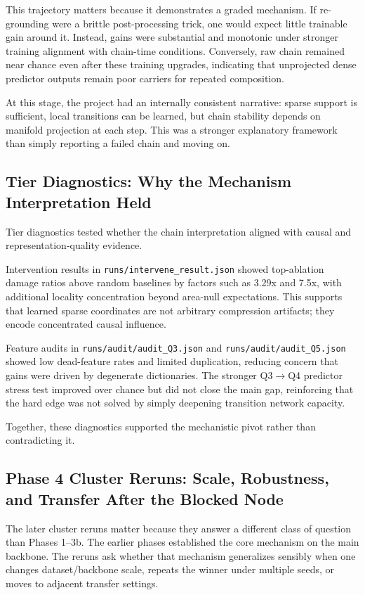 \documentclass[11pt]{article}
\begin{document}
This trajectory matters because it demonstrates a graded mechanism. If re-grounding were a brittle post-processing trick, one would expect little trainable gain around it. Instead, gains were substantial and monotonic under stronger training alignment with chain-time conditions. Conversely, raw chain remained near chance even after these training upgrades, indicating that unprojected dense predictor outputs remain poor carriers for repeated composition.

At this stage, the project had an internally consistent narrative: sparse support is sufficient, local transitions can be learned, but chain stability depends on manifold projection at each step. This was a stronger explanatory framework than simply reporting a failed chain and moving on.

\subsection{Tier Diagnostics: Why the Mechanism Interpretation Held}
Tier diagnostics tested whether the chain interpretation aligned with causal and representation-quality evidence.

Intervention results in \texttt{runs/intervene\_result.json} showed top-ablation damage ratios above random baselines by factors such as 3.29x and 7.5x, with additional locality concentration beyond area-null expectations. This supports that learned sparse coordinates are not arbitrary compression artifacts; they encode concentrated causal influence.

Feature audits in \texttt{runs/audit/audit\_Q3.json} and \texttt{runs/audit/audit\_Q5.json} showed low dead-feature rates and limited duplication, reducing concern that gains were driven by degenerate dictionaries. The stronger Q3$\rightarrow$Q4 predictor stress test improved over chance but did not close the main gap, reinforcing that the hard edge was not solved by simply deepening transition network capacity.

Together, these diagnostics supported the mechanistic pivot rather than contradicting it.

\subsection{Phase 4 Cluster Reruns: Scale, Robustness, and Transfer After the Blocked Node}
The later cluster reruns matter because they answer a different class of question than Phases 1--3b. The earlier phases established the core mechanism on the main backbone. The reruns ask whether that mechanism generalizes sensibly when one changes dataset/backbone scale, repeats the winner under multiple seeds, or moves to adjacent transfer settings.
\end{document}
